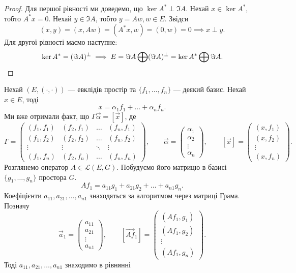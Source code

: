 \documentclass{math_library}
\begin{document}
\begin{proof}
Для першої рівності ми доведемо, що $\ker A^* \perp \Im A$. Нехай $x \in \ker A^*$, тобто $A^*x = 0$. Нехай $y \in \Im A$, тобто $y = Aw,w \in E$. Звідси 
\[
(x,y) = (x, Aw) = (A^*x, w) = (0, w) = 0 \implies x \perp y.
\]
Для другої рівності маємо наступне:
\[
\ker A^* = (\Im A)^{\perp} \implies E = \Im A \bigoplus (\Im A)^{\perp} = \ker A^* \bigoplus \Im A. \qedhere
\]
\end{proof}
\noindent
Нехай $(E,(\cdot,\cdot))$ --- евклідів простір та $\{f_1,\dots,f_n\}$ --- деякий базис. Нехай $x \in E$, тоді
\[ 
x = \alpha_1 f_1 + \dots + \alpha_n f_n.
\]
Ми вже отримали факт, що $\Gamma \vec{\alpha} = [\vec{x}]$, де
\[
\Gamma = \begin{pmatrix}
(f_1,f_1) & (f_2,f_1) & \dots & (f_n,f_1) \\
(f_1,f_2) & (f_2,f_2) & \dots & (f_n,f_2) \\
\vdots & \vdots & \ddots & \vdots \\
(f_1,f_n) & (f_2,f_n) & \dots & (f_n,f_n)
\end{pmatrix}, \qquad
\vec{\alpha} = \begin{pmatrix}
\alpha_1 \\ \alpha_2 \\ \vdots \\ \alpha_n
\end{pmatrix}, \qquad
[\vec{x}] = \begin{pmatrix}
(x,f_1) \\ (x,f_2) \\ \vdots \\ (x,f_n)
\end{pmatrix}.
\]
Розглянемо оператор $A \in \mathcal{L}(E,G)$. Побудуємо його матрицю в базисі $\{g_1,\dots,g_n\}$ простора $G$.
\[
Af_1 = a_{11}g_1 + a_{21}g_2 + \dots + a_{n1}g_n.
\]
Коефіцієнти $a_{11},a_{21},\dots,a_{n1}$ знаходяться за алгоритмом через матриці Грама. Позначу 
\[
\vec{a}_1 = \begin{pmatrix}
a_{11} \\ a_{21} \\ \vdots \\ a_{n1}
\end{pmatrix}, \qquad
[\overrightarrow{Af}_1] = \begin{pmatrix}
(Af_1,g_1) \\ (Af_1,g_2) \\ \vdots \\ (Af_1,g_n)
\end{pmatrix}.
\]
Тоді $a_{11},a_{21},\dots,a_{n1}$ знаходимо в рівнянні 
\end{document}
